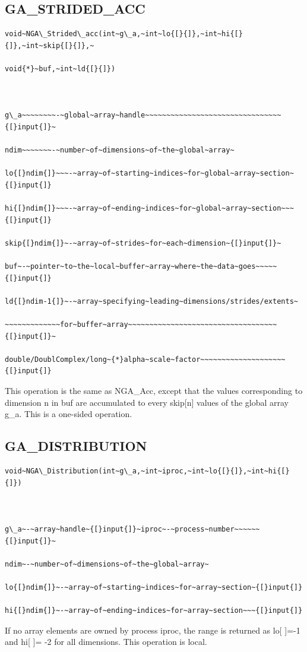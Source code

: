 \subsection*{\label{sub:GA_STRIDED_ACC}GA\_STRIDED\_ACC}
\begin{verbatim}
void~NGA\_Strided\_acc(int~g\_a,~int~lo{[}{]},~int~hi{[}{]},~int~skip{[}{]},~

void{*}~buf,~int~ld{[}{]})



g\_a~~~~~~~~-~global~array~handle~~~~~~~~~~~~~~~~~~~~~~~~~~~~~~~~{[}input{]}~

ndim~~~~~~~-~number~of~dimensions~of~the~global~array~

lo{[}ndim{]}~~~-~array~of~starting~indices~for~global~array~section~{[}input{]}

hi{[}ndim{]}~~~-~array~of~ending~indices~for~global~array~section~~~{[}input{]}

skip{[}ndim{]}~-~array~of~strides~for~each~dimension~{[}input{]}~

buf~-~pointer~to~the~local~buffer~array~where~the~data~goes~~~~~{[}input{]}

ld{[}ndim-1{]}~-~array~specifying~leading~dimensions/strides/extents~

~~~~~~~~~~~~~for~buffer~array~~~~~~~~~~~~~~~~~~~~~~~~~~~~~~~~~~~{[}input{]}~

double/DoublComplex/long~{*}alpha~scale~factor~~~~~~~~~~~~~~~~~~~~{[}input{]}
\end{verbatim}
This operation is the same as NGA\_Acc, except that the values corresponding
to dimension n in buf are accumulated to every skip{[}n{]} values
of the global array g\_a. This is a one-sided operation. 


\subsection*{\label{sub:GA_DISTRIBUTION}GA\_DISTRIBUTION}
\begin{verbatim}
void~NGA\_Distribution(int~g\_a,~int~iproc,~int~lo{[}{]},~int~hi{[}{]})



g\_a~-~array~handle~{[}input{]}~iproc~-~process~number~~~~~~{[}input{]}~

ndim~-~number~of~dimensions~of~the~global~array~

lo{[}ndim{]}~-~array~of~starting~indices~for~array~section~{[}input{]}

hi{[}ndim{]}~-~array~of~ending~indices~for~array~section~~~{[}input{]}
\end{verbatim}
If no array elements are owned by process iproc, the range is returned
as lo{[} {]}=-1 and hi{[} {]}= -2 for all dimensions. This operation
is local. 


